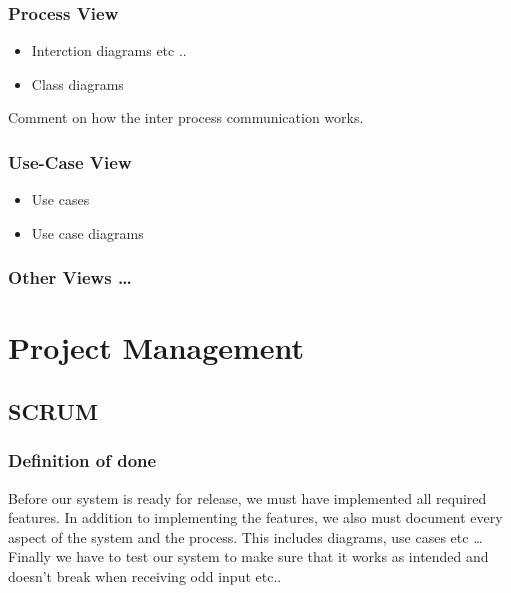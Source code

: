 \documentclass[11pt]{article}
\begin{document}
\subsubsection{Process View}
\label{sec-4-1-6}

\begin{itemize}
\item Interction diagrams etc ..
\item Class diagrams
\end{itemize}

    Comment on how the inter process communication works.
\subsubsection{Use-Case View}
\label{sec-4-1-7}

\begin{itemize}
\item Use cases
\item Use case diagrams
\end{itemize}
\subsubsection{Other Views \ldots{}}
\label{sec-4-1-8}
\section{Project Management}
\label{sec-5}
\subsection{SCRUM}
\label{sec-5-1}
\subsubsection{Definition of done}
\label{sec-5-1-1}

Before our system is ready for release, we must have implemented all required features.
In addition to implementing the features, we also must document every aspect of the system
and the process. This includes diagrams, use cases etc \ldots{}
Finally we have to test our system to make sure that it works as intended and doesn't break 
when receiving odd input etc..
\end{document}
